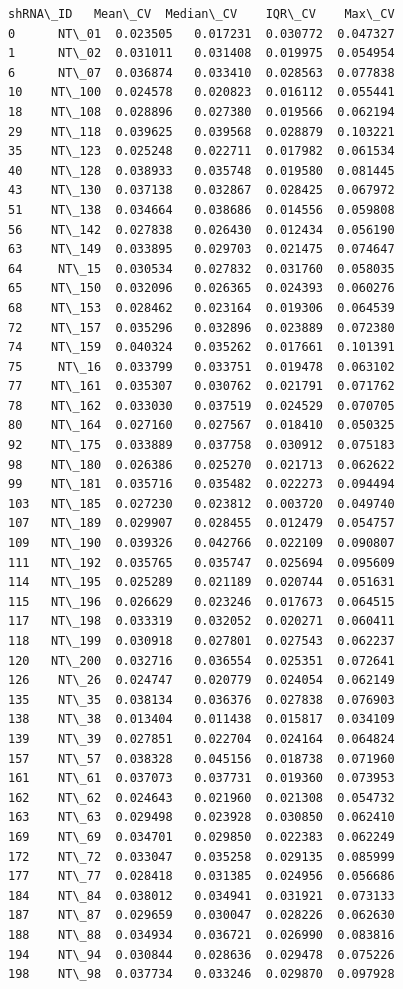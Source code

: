 \documentclass[11pt]{article}
\begin{document}
    
    \begin{Verbatim}[commandchars=\\\{\}]
    shRNA\_ID   Mean\_CV  Median\_CV    IQR\_CV    Max\_CV
0      NT\_01  0.023505   0.017231  0.030772  0.047327
1      NT\_02  0.031011   0.031408  0.019975  0.054954
6      NT\_07  0.036874   0.033410  0.028563  0.077838
10    NT\_100  0.024578   0.020823  0.016112  0.055441
18    NT\_108  0.028896   0.027380  0.019566  0.062194
29    NT\_118  0.039625   0.039568  0.028879  0.103221
35    NT\_123  0.025248   0.022711  0.017982  0.061534
40    NT\_128  0.038933   0.035748  0.019580  0.081445
43    NT\_130  0.037138   0.032867  0.028425  0.067972
51    NT\_138  0.034664   0.038686  0.014556  0.059808
56    NT\_142  0.027838   0.026430  0.012434  0.056190
63    NT\_149  0.033895   0.029703  0.021475  0.074647
64     NT\_15  0.030534   0.027832  0.031760  0.058035
65    NT\_150  0.032096   0.026365  0.024393  0.060276
68    NT\_153  0.028462   0.023164  0.019306  0.064539
72    NT\_157  0.035296   0.032896  0.023889  0.072380
74    NT\_159  0.040324   0.035262  0.017661  0.101391
75     NT\_16  0.033799   0.033751  0.019478  0.063102
77    NT\_161  0.035307   0.030762  0.021791  0.071762
78    NT\_162  0.033030   0.037519  0.024529  0.070705
80    NT\_164  0.027160   0.027567  0.018410  0.050325
92    NT\_175  0.033889   0.037758  0.030912  0.075183
98    NT\_180  0.026386   0.025270  0.021713  0.062622
99    NT\_181  0.035716   0.035482  0.022273  0.094494
103   NT\_185  0.027230   0.023812  0.003720  0.049740
107   NT\_189  0.029907   0.028455  0.012479  0.054757
109   NT\_190  0.039326   0.042766  0.022109  0.090807
111   NT\_192  0.035765   0.035747  0.025694  0.095609
114   NT\_195  0.025289   0.021189  0.020744  0.051631
115   NT\_196  0.026629   0.023246  0.017673  0.064515
117   NT\_198  0.033319   0.032052  0.020271  0.060411
118   NT\_199  0.030918   0.027801  0.027543  0.062237
120   NT\_200  0.032716   0.036554  0.025351  0.072641
126    NT\_26  0.024747   0.020779  0.024054  0.062149
135    NT\_35  0.038134   0.036376  0.027838  0.076903
138    NT\_38  0.013404   0.011438  0.015817  0.034109
139    NT\_39  0.027851   0.022704  0.024164  0.064824
157    NT\_57  0.038328   0.045156  0.018738  0.071960
161    NT\_61  0.037073   0.037731  0.019360  0.073953
162    NT\_62  0.024643   0.021960  0.021308  0.054732
163    NT\_63  0.029498   0.023928  0.030850  0.062410
169    NT\_69  0.034701   0.029850  0.022383  0.062249
172    NT\_72  0.033047   0.035258  0.029135  0.085999
177    NT\_77  0.028418   0.031385  0.024956  0.056686
184    NT\_84  0.038012   0.034941  0.031921  0.073133
187    NT\_87  0.029659   0.030047  0.028226  0.062630
188    NT\_88  0.034934   0.036721  0.026990  0.083816
194    NT\_94  0.030844   0.028636  0.029478  0.075226
198    NT\_98  0.037734   0.033246  0.029870  0.097928
    \end{Verbatim}
\end{document}
